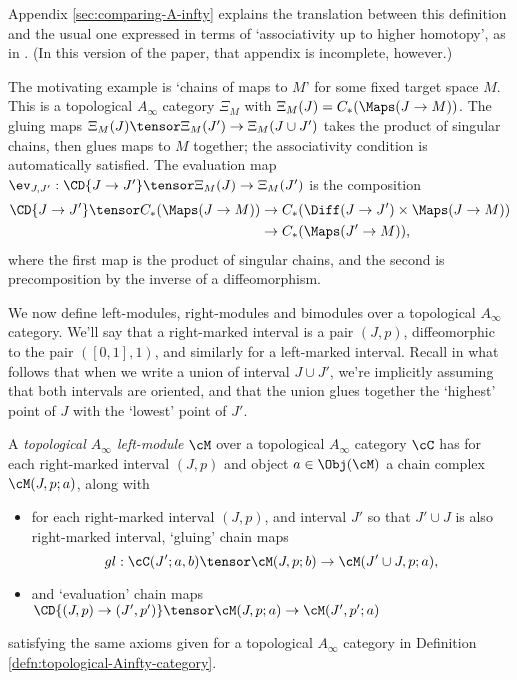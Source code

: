Appendix \ref{sec:comparing-A-infty} explains the translation between this definition and the usual one expressed in terms of `associativity up to higher homotopy', as in \cite{MR1854636}. (In this version of the paper, that appendix is incomplete, however.)

The motivating example is `chains of maps to $M$' for some fixed target space $M$. This is a topological $A_\infty$ category $\Xi_M$ with $\Xi_M(J) = C_*(\Maps(J \to M))$. The gluing maps $\Xi_M(J) \tensor \Xi_M(J') \to \Xi_M(J \cup J')$  takes the product of singular chains, then glues maps to $M$ together; the associativity condition is automatically satisfied. The evaluation map $\ev_{J,J'} : \CD{J \to J'} \tensor \Xi_M(J) \to \Xi_M(J')$ is the composition
\begin{align*}
\CD{J \to J'} \tensor C_*(\Maps(J \to M)) & \to C_*(\Diff(J \to J') \times \Maps(J \to M)) \\ & \to C_*(\Maps(J' \to M)),
\end{align*}
where the first map is the product of singular chains, and the second is precomposition by the inverse of a diffeomorphism.

We now define left-modules, right-modules and bimodules over a topological $A_\infty$ category. We'll say that a right-marked interval is a pair $(J,p)$, diffeomorphic to the pair $([0,1],1)$, and similarly for a left-marked interval. Recall in what follows that when we write a union of interval $J \cup J'$, we're implicitly assuming that both intervals are oriented, and that the union glues together the `highest' point of $J$ with the `lowest' point of $J'$.

\begin{defn}
\label{defn:topological-Ainfty-module}%
A \emph{topological $A_\infty$ left-module} $\cM$ over a topological $A_\infty$ category $\cC$ has for each right-marked interval $(J,p)$ and object $a \in \Obj(\cM)$ a chain complex $\cM(J,p; a)$, along with
\begin{itemize}
\item for each right-marked interval $(J,p)$, and interval $J'$ so that $J' \cup J$ is also right-marked interval, `gluing' chain maps
$$gl: \cC(J';a,b) \tensor \cM(J,p;b) \to \cM(J' \cup J,p;a),$$
\item and `evaluation' chain maps $\CD{(J,p) \to (J',p')} \tensor \cM(J,p;a) \to \cM(J',p';a)$
\end{itemize}
satisfying the same axioms given for a topological $A_\infty$ category in Definition \ref{defn:topological-Ainfty-category}.
\end{defn}

